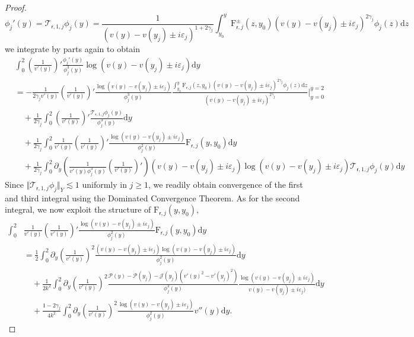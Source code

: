\documentclass[11pt,reqno]{amsproc}
\theoremstyle{definition}
\numberwithin{equation}{section}
\newcommand{\cJ}{{\mathcal{J}}}
\newcommand{\sr}{{\mathsf{r}}}
\newcommand{\cT}{{\mathcal T}}
\renewcommand{\d}{\mathrm{d}}
\newcommand{\ep}{\varepsilon}
\renewcommand{\P}{{\mathcal{P}}}
\begin{document}
\begin{proof}
\begin{equation}\label{eq:pyphij}
\phi_j'(y)=\cT_{\sr,1,j}\phi_j(y) =\frac{1}{(v(y) - v(y_j) \pm i\ep_j)^{1+2\gamma_j}}\int_{y_0}^y \mathrm{F}_{\sr,j}^\pm (z,y_0) (v(y) - v(y_j) \pm i\ep_j)^{2\gamma_j} \phi_j(z) \d z
\end{equation}
we integrate by parts again to obtain 
\begin{align*}
&\int_0^2 \left( \frac{1}{v'(y)} \right)'  \frac{\phi_j'(y)}{\phi_j^3(y)} \log(v(y) - v(y_j) \pm i\ep_j) \d y \\
&= -\frac{1}{2\gamma_j v'(y)}\left( \frac{1}{v'(y)} \right)' \frac{\log(v(y) - v(y_j) \pm i\ep_j)}{\phi_j^3(y)} \frac{\int_{y_0}^y \mathrm{F}_{\sr,j}(z,y_0) (v(y) - v(y_j) \pm i\ep_j)^{2\gamma_j}\phi_j(z) \d z}{(v(y) - v(y_j) \pm i\ep_j)^{2\gamma_j}}  \Big|_{y=0}^{y=2}  \\ 
&\quad + \frac{1}{2\gamma_j}\int_0^2 \left( \frac{1}{v'(y)} \right)' \frac{\cT_{\sr,1,j}\phi_j(y)}{\phi_j^{3}(y)} \d y  \\
&\quad + \frac{1}{2\gamma_j}\int_0^2 \frac{1}{v'(y)}\left( \frac{1}{v'(y)} \right)' \frac{\log (v(y) - v(y_j) \pm i\ep_j)}{\phi_j^2(y)}\mathrm{F}_{\sr,j}(y,y_0) \d y \\
&\quad + \frac{1}{2\gamma_j} \int_0^2 \partial_y \left( \frac{1}{v'(y) \phi_j^3(y)}\left( \frac{1}{v'(y)} \right)' \right) (v(y) - v(y_j)\pm i\ep_j)\log(v(y) - v(y_j) \pm i\ep_j)\cT_{\sr,1,j}\phi_j(y) \d y 
\end{align*}
Since $\Vert \cT_{\sr,1,j}\phi_j\Vert_Y \lesssim 1$ uniformly in $j\geq 1$, we readily obtain convergence of the first and third integral using the Dominated Convergence Theorem. As for the second integral, we now exploit the structure of $\mathrm{F}_{\sr,j}(y,y_0)$, 
\begin{align*}
\int_0^2 &\frac{1}{v'(y)}\left( \frac{1}{v'(y)} \right)' \frac{\log (v(y) - v(y_j) \pm i\ep_j)}{\phi_j^2(y)}\mathrm{F}_{\sr,j}(y,y_0)  \d y \\
&=\frac12\int_0^2 \partial_y \left(\frac{1}{v'(y)}\right)^2 \frac{(v(y) - v(y_j) \pm i\ep_j)\log(v(y) - v(y_j) \pm i\ep_j)}{\phi_j^2(y)} \d y \\
&\quad +\frac{1}{2k^2} \int_0^2 \partial_y \left(\frac{1}{v'(y)}\right)^2 \frac{\P(y) - \P(y_j) - \cJ(y_j)(v'(y)^2 -v'(y_j)^2)}{\phi_j^2(y)}\frac{\log(v(y) - v(y_j) \pm i\ep_j)}{v(y) - v(y_j) \pm i\ep_j)} \d y \\
&\quad +\frac{1-2\gamma_j}{4k^2}\int_0^2 \partial_y \left( \frac{1}{v'(y)} \right)^2 \frac{\log(v(y) - v(y_j) \pm i\ep_j)}{\phi_j^2(y)}v''(y) \d y.
\end{align*}

\end{proof}
\end{document}
